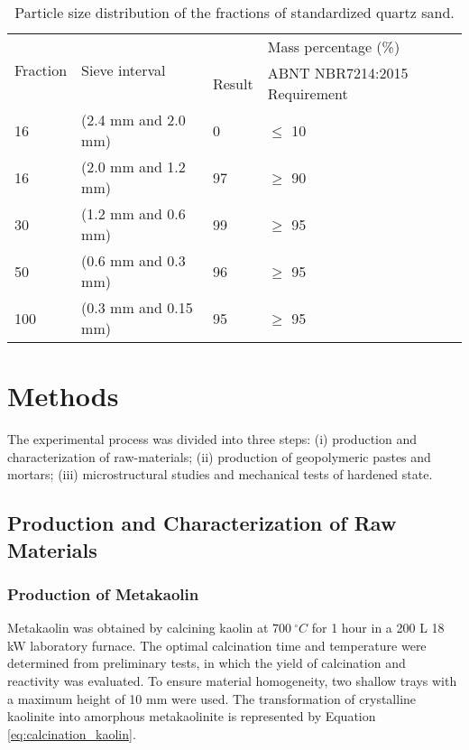 \begin{table}[H]
    \caption{Particle size distribution of the fractions of standardized quartz sand.}
    \label{tab:quartz_sand_granulometry}
    \centering
    \begin{tabular}{p{} p{} p{} p{}}
        \hline
        \multirow{2}{*}{Fraction} & \multirow{2}{*}{Sieve interval} & \multicolumn{2}{c}{Mass percentage (\%)} \\ \cline{3-4}       
        & & Result & ABNT NBR7214:2015 Requirement\\
        \hline
        16 & (2.4 mm and 2.0 mm) & 0 & $\leq$ 10 \\
        16 & (2.0 mm and 1.2 mm) & 97 & $\geq$ 90 \\
        30 & (1.2 mm and 0.6 mm) & 99 & $\geq$ 95 \\
        50 & (0.6 mm and 0.3 mm) & 96 & $\geq$ 95 \\
        100 & (0.3 mm and 0.15 mm) & 95 & $\geq$ 95 \\
        \hline
    \end{tabular}
\end{table}

\section{Methods}
\label{sec:methods}
The experimental process was divided into three steps: (i) production and characterization of raw-materials; (ii) production of geopolymeric pastes and mortars; (iii) microstructural studies and mechanical tests of hardened state.

\subsection{Production and Characterization of Raw Materials}
\label{sec:production_characterization_raw_materials}

\subsubsection{Production of Metakaolin}
\label{sec:production_of_metakaolin}

Metakaolin was obtained by calcining kaolin at $700\ ^\circ C$ for 1 hour in a 200 L 18 kW laboratory furnace.
The optimal calcination time and temperature were determined from preliminary tests, in which the yield of calcination and reactivity was evaluated.
To ensure material homogeneity, two shallow trays with a maximum height of 10 mm were used.
The transformation of crystalline kaolinite into amorphous metakaolinite is represented by Equation \ref{eq:calcination_kaolin}.

